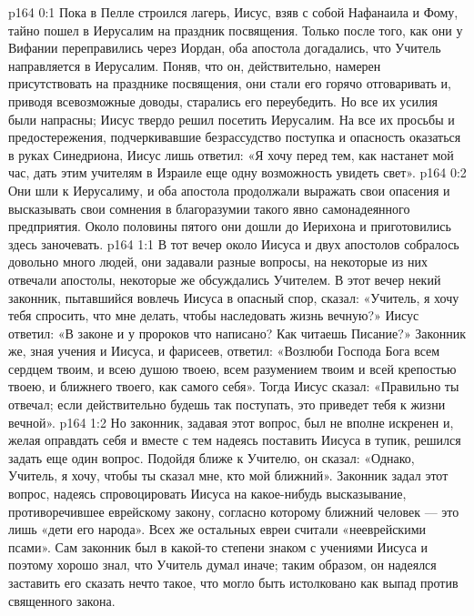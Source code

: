 \author{Комиссия срединников}
\vs p164 0:1 Пока в Пелле строился лагерь, Иисус, взяв с собой Нафанаила и Фому, тайно пошел в Иерусалим на праздник посвящения. Только после того, как они у Вифании переправились через Иордан, оба апостола догадались, что Учитель направляется в Иерусалим. Поняв, что он, действительно, намерен присутствовать на празднике посвящения, они стали его горячо отговаривать и, приводя всевозможные доводы, старались его переубедить. Но все их усилия были напрасны; Иисус твердо решил посетить Иерусалим. На все их просьбы и предостережения, подчеркивавшие безрассудство поступка и опасность оказаться в руках Синедриона, Иисус лишь ответил: «Я хочу перед тем, как настанет мой час, дать этим учителям в Израиле еще одну возможность увидеть свет».
\vs p164 0:2 Они шли к Иерусалиму, и оба апостола продолжали выражать свои опасения и высказывать свои сомнения в благоразумии такого явно самонадеянного предприятия. Около половины пятого они дошли до Иерихона и приготовились здесь заночевать.
\vs p164 1:1 В тот вечер около Иисуса и двух апостолов собралось довольно много людей, они задавали разные вопросы, на некоторые из них отвечали апостолы, некоторые же обсуждались Учителем. В этот вечер некий законник, пытавшийся вовлечь Иисуса в опасный спор, сказал: «Учитель, я хочу тебя спросить, что мне делать, чтобы наследовать жизнь вечную?» Иисус ответил: «В законе и у пророков что написано? Как читаешь Писание?» Законник же, зная учения и Иисуса, и фарисеев, ответил: «Возлюби Господа Бога всем сердцем твоим, и всею душою твоею, всем разумением твоим и всей крепостью твоею, и ближнего твоего, как самого себя». Тогда Иисус сказал: «Правильно ты отвечал; если действительно будешь так поступать, это приведет тебя к жизни вечной».
\vs p164 1:2 Но законник, задавая этот вопрос, был не вполне искренен и, желая оправдать себя и вместе с тем надеясь поставить Иисуса в тупик, решился задать еще один вопрос. Подойдя ближе к Учителю, он сказал: «Однако, Учитель, я хочу, чтобы ты сказал мне, кто мой ближний». Законник задал этот вопрос, надеясь спровоцировать Иисуса на какое\hyp{}нибудь высказывание, противоречившее еврейскому закону, согласно которому ближний человек --- это лишь «дети его народа». Всех же остальных евреи считали «нееврейскими псами». Сам законник был в какой\hyp{}то степени знаком с учениями Иисуса и поэтому хорошо знал, что Учитель думал иначе; таким образом, он надеялся заставить его сказать нечто такое, что могло быть истолковано как выпад против священного закона.
